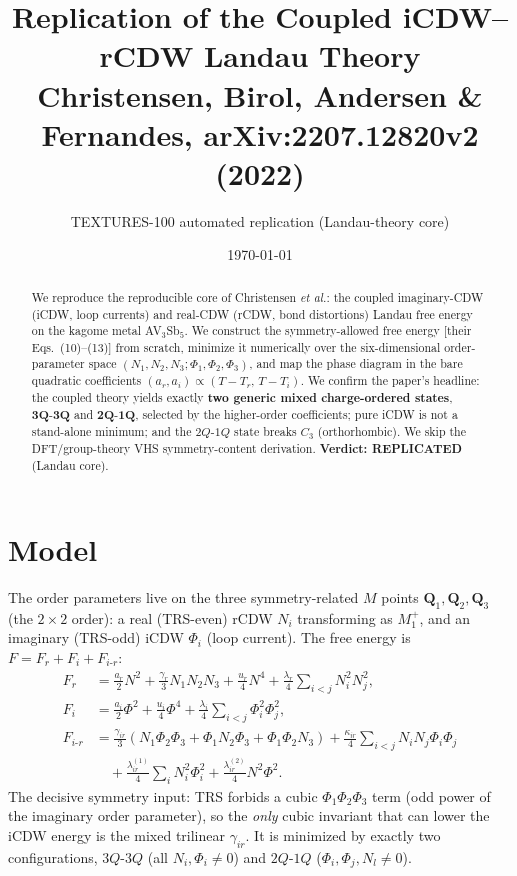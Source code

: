 \documentclass[11pt]{article}
\title{Replication of the Coupled iCDW--rCDW Landau Theory\\
\large Christensen, Birol, Andersen \& Fernandes, arXiv:2207.12820v2 (2022)}
\author{TEXTURES-100 automated replication (Landau-theory core)}
\date{\today}
\begin{document}
\maketitle

\begin{abstract}
We reproduce the reproducible core of Christensen \emph{et al.}: the coupled
imaginary-CDW (iCDW, loop currents) and real-CDW (rCDW, bond distortions)
Landau free energy on the kagome metal AV$_3$Sb$_5$. We construct the
symmetry-allowed free energy [their Eqs.~(10)--(13)] from scratch, minimize it
numerically over the six-dimensional order-parameter space
$(N_1,N_2,N_3;\Phi_1,\Phi_2,\Phi_3)$, and map the phase diagram in the bare
quadratic coefficients $(a_r,a_i)\propto(T-T_r,\,T-T_i)$. We confirm the paper's
headline: the coupled theory yields exactly \textbf{two generic mixed
charge-ordered states}, $\mathbf{3Q\text{-}3Q}$ and $\mathbf{2Q\text{-}1Q}$,
selected by the higher-order coefficients; pure iCDW is not a stand-alone
minimum; and the $2Q\text{-}1Q$ state breaks $C_3$ (orthorhombic). We skip the
DFT/group-theory VHS symmetry-content derivation. \textbf{Verdict: REPLICATED}
(Landau core).
\end{abstract}

\section{Model}
The order parameters live on the three symmetry-related $M$ points
$\mathbf{Q}_1,\mathbf{Q}_2,\mathbf{Q}_3$ (the $2\times2$ order): a real
(TRS-even) rCDW $N_i$ transforming as $M_1^+$, and an imaginary (TRS-odd) iCDW
$\Phi_i$ (loop current). The free energy is $F=F_r+F_i+F_{i\text{-}r}$:
\begin{align}
F_r &= \tfrac{a_r}{2}N^2 + \tfrac{\gamma_r}{3}N_1N_2N_3
       + \tfrac{u_r}{4}N^4 + \tfrac{\lambda_r}{4}\!\!\sum_{i<j}\!N_i^2N_j^2,\\
F_i &= \tfrac{a_i}{2}\Phi^2 + \tfrac{u_i}{4}\Phi^4
       + \tfrac{\lambda_i}{4}\!\!\sum_{i<j}\!\Phi_i^2\Phi_j^2,\\
F_{i\text{-}r} &= \tfrac{\gamma_{ir}}{3}(N_1\Phi_2\Phi_3+\Phi_1N_2\Phi_3+\Phi_1\Phi_2N_3)
   + \tfrac{\kappa_{ir}}{4}\!\!\sum_{i<j}\!N_iN_j\Phi_i\Phi_j \nonumber\\
&\quad + \tfrac{\lambda_{ir}^{(1)}}{4}\sum_i N_i^2\Phi_i^2
       + \tfrac{\lambda_{ir}^{(2)}}{4}N^2\Phi^2 .
\end{align}
The decisive symmetry input: TRS forbids a cubic $\Phi_1\Phi_2\Phi_3$ term
(odd power of the imaginary order parameter), so the \emph{only} cubic invariant
that can lower the iCDW energy is the mixed trilinear $\gamma_{ir}$. It is
minimized by exactly two configurations, $3Q\text{-}3Q$ (all $N_i,\Phi_i\neq0$)
and $2Q\text{-}1Q$ ($\Phi_i,\Phi_j,N_l\neq0$).
\end{document}
